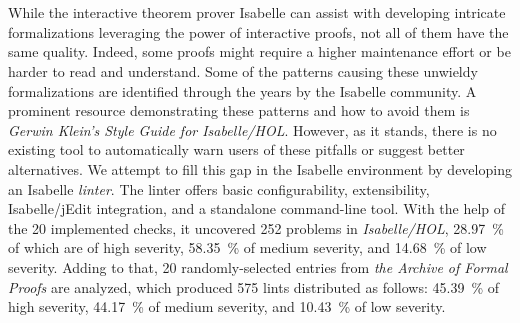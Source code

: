 \chapter{\abstractname}

While the interactive theorem prover Isabelle can assist with developing intricate formalizations 
leveraging the power of
interactive proofs, not all of them have the same quality. Indeed, some proofs might require a
higher maintenance effort or be harder to read and understand. 
Some of the patterns causing these unwieldy formalizations are identified through the years
by the Isabelle community. A prominent resource demonstrating these patterns and how to avoid 
them is 
\textit{Gerwin Klein's Style Guide for Isabelle/HOL}. However, as it stands, there is no
existing tool to automatically warn users of these pitfalls or suggest better alternatives.
We attempt to fill this gap in the Isabelle environment by developing an Isabelle 
\textit{linter}. The 
linter offers basic configurability, extensibility, Isabelle/jEdit integration, and a
standalone command-line tool. With the help of the 20 implemented checks, it uncovered 252 
problems in \textit{Isabelle/HOL}, \SI{28.97}{\percent} of which are of high severity, \SI{58.35}{\percent} of medium severity, and \SI{14.68}{\percent} of low severity.
Adding to that, 20 randomly-selected entries from \textit{the Archive of Formal Proofs} are analyzed,
which produced 575 lints distributed as follows: \SI{45.39}{\percent} of high severity, \SI{44.17}{\percent}
 of medium severity,
and \SI{10.43}{\percent} of low severity.